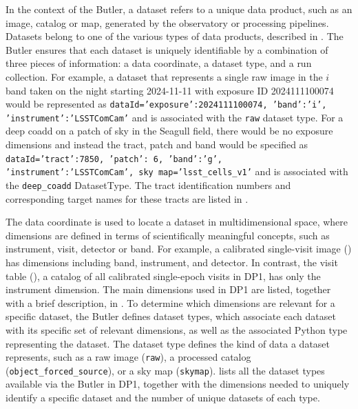 In the context of the \gls{Butler}, a dataset refers to a unique data product, such as an image, catalog or map, generated by the observatory or processing pipelines.
Datasets belong to one of the various types of data products, described in .
The \gls{Butler} ensures that each dataset is uniquely identifiable by a combination of three pieces of information: a data coordinate, a dataset type, and a run collection.
For example, a dataset that represents a single raw image  in the $i$ band taken on the night starting 2024-11-11 with exposure ID 2024111100074 would be represented as \texttt{dataId={'exposure':2024111100074, 'band':'i', 'instrument':'LSSTComCam'}} and is associated with the \texttt{raw} dataset type.
For a deep coadd on a \gls{patch} of sky in the Seagull field, there would be no exposure dimensions and instead the tract, \gls{patch} and band would be specified as  \texttt{dataId={'tract':7850, 'patch': 6, 'band':'g', 'instrument':'LSSTComCam', sky map='lsst\_cells\_v1'}} and is associated with the \texttt{deep\_coadd} DatasetType.
The tract identification numbers and corresponding target names for these tracts are listed in .





The data coordinate is used to locate a dataset in multidimensional space, where dimensions are defined in terms of scientifically meaningful concepts, such as instrument, visit, detector or band.
For example, a calibrated single-visit image () has dimensions including band, instrument, and detector.
In contrast, the visit table (), a catalog of all calibrated single-epoch visits in \gls{DP1}, has only the instrument dimension.
The main dimensions used in \gls{DP1} are listed, together with a brief description, in .
To determine which dimensions are relevant for a specific dataset, the \gls{Butler} defines dataset types, which associate each dataset with its specific set of relevant dimensions, as well as the associated Python type representing the dataset.
The dataset type defines the kind of data a dataset represents, such as  a raw image  (\texttt{raw}), a processed catalog (\texttt{object\_forced\_source}), or a sky map (\texttt{skymap}).
 lists all the dataset types available via the Butler in \gls{DP1}, together with the dimensions needed to uniquely identify a specific dataset and the number of unique datasets of each type.

